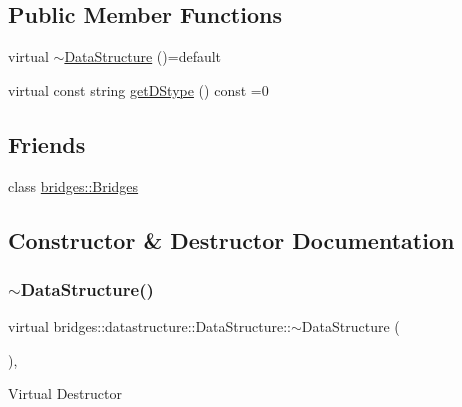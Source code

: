 \subsection*{Public Member Functions}
\begin{DoxyCompactItemize}
\item 
virtual \mbox{\hyperlink{classbridges_1_1datastructure_1_1_data_structure_a54bde1c8f14ca3bff47910a2e48d586a}{$\sim$\+Data\+Structure}} ()=default
\item 
virtual const string \mbox{\hyperlink{classbridges_1_1datastructure_1_1_data_structure_a4ff66cb34409f11fe9fc647f6d8a22ce}{get\+D\+Stype}} () const =0
\end{DoxyCompactItemize}
\subsection*{Friends}
\begin{DoxyCompactItemize}
\item 
class \mbox{\hyperlink{classbridges_1_1datastructure_1_1_data_structure_a5c4164a6c5cd1eab3f12871efc2dbe26}{bridges\+::\+Bridges}}
\end{DoxyCompactItemize}


\subsection{Constructor \& Destructor Documentation}
\mbox{\label{classbridges_1_1datastructure_1_1_data_structure_a54bde1c8f14ca3bff47910a2e48d586a}} 
\subsubsection{\texorpdfstring{$\sim$\+Data\+Structure()}{~DataStructure()}}
{\footnotesize\ttfamily virtual bridges\+::datastructure\+::\+Data\+Structure\+::$\sim$\+Data\+Structure (\begin{DoxyParamCaption}{ }\end{DoxyParamCaption})\hspace{0.3cm}{\ttfamily [virtual]}, {\ttfamily [default]}}

Virtual Destructor 

